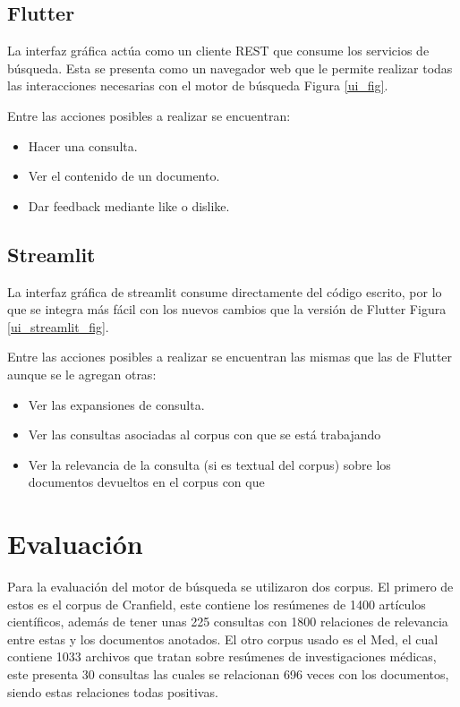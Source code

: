 \documentclass[runningheads]{llncs}
\begin{document}
\subsection{Flutter}

La interfaz gráfica actúa como un cliente REST que consume los servicios de búsqueda. Esta
se presenta como un navegador web que le permite realizar todas las interacciones necesarias
con el motor de búsqueda Figura \ref{ui_fig}.

Entre las acciones posibles a realizar se encuentran:

\begin{itemize}

\item Hacer una consulta.
\item Ver el contenido de un documento.
\item Dar feedback mediante like o dislike.

\end{itemize}

\subsection{Streamlit}

La interfaz gráfica de streamlit consume directamente del código escrito, por lo que se 
integra más fácil con los nuevos cambios que la versión de Flutter Figura \ref{ui_streamlit_fig}.

Entre las acciones posibles a realizar se encuentran las mismas que las de Flutter aunque se le
agregan otras:

\begin{itemize}

\item Ver las expansiones de consulta.
\item Ver las consultas asociadas al corpus con que se está trabajando
\item Ver la relevancia de la consulta (si es textual del corpus) sobre los 
documentos devueltos en el corpus con que

\end{itemize}

\section{Evaluación}

Para la evaluación del motor de búsqueda se utilizaron dos corpus. El primero de estos
es el corpus de Cranfield, este contiene los resúmenes de 1400 artículos científicos, además
de tener unas 225 consultas con 1800 relaciones de relevancia entre estas y los documentos anotados.
El otro corpus usado es el Med, el cual contiene 1033 archivos que tratan sobre resúmenes de investigaciones
médicas, este presenta 30 consultas las cuales se relacionan 696 veces con los documentos, siendo estas
relaciones todas positivas.
\end{document}

